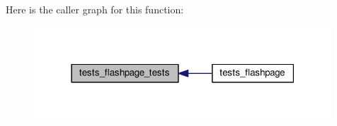 Here is the caller graph for this function\+:
\nopagebreak
\begin{figure}[H]
\begin{center}
\leavevmode
\includegraphics[width=315pt]{tests-flashpage_8c_adaa14e5b0014cf679d44aad17f8ab02f_icgraph}
\end{center}
\end{figure}
